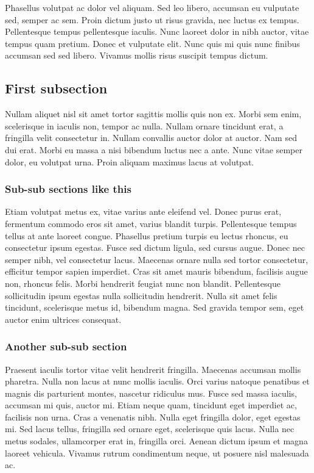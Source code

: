 \documentclass[12pt,letterpaper]{article}
\begin{document}
Phasellus volutpat ac dolor vel aliquam. Sed leo libero, accumsan eu vulputate sed, semper ac sem. Proin dictum justo ut risus gravida, nec luctus ex tempus. Pellentesque tempus pellentesque iaculis. Nunc laoreet dolor in nibh auctor, vitae tempus quam pretium. Donec et vulputate elit. Nunc quis mi quis nunc finibus accumsan sed sed libero. Vivamus mollis risus suscipit tempus dictum.

\subsection{First subsection}

Nullam aliquet nisl sit amet tortor sagittis mollis quis non ex. Morbi sem enim, scelerisque in iaculis non, tempor ac nulla. Nullam ornare tincidunt erat, a fringilla velit consectetur in. Nullam convallis auctor dolor at auctor. Nam sed dui erat. Morbi eu massa a nisi bibendum luctus nec a ante. Nunc vitae semper dolor, eu volutpat urna. Proin aliquam maximus lacus at volutpat.

\subsubsection{Sub-sub sections like this}

Etiam volutpat metus ex, vitae varius ante eleifend vel. Donec purus erat, fermentum commodo eros sit amet, varius blandit turpis. Pellentesque tempus tellus at ante laoreet congue. Phasellus pretium turpis eu lectus rhoncus, eu consectetur ipsum egestas. Fusce sed dictum ligula, sed cursus augue. Donec nec semper nibh, vel consectetur lacus. Maecenas ornare nulla sed tortor consectetur, efficitur tempor sapien imperdiet. Cras sit amet mauris bibendum, facilisis augue non, rhoncus felis. Morbi hendrerit feugiat nunc non blandit. Pellentesque sollicitudin ipsum egestas nulla sollicitudin hendrerit. Nulla sit amet felis tincidunt, scelerisque metus id, bibendum magna. Sed gravida tempor sem, eget auctor enim ultrices consequat.

\subsubsection{Another sub-sub section}

Praesent iaculis tortor vitae velit hendrerit fringilla. Maecenas accumsan mollis pharetra. Nulla non lacus at nunc mollis iaculis. Orci varius natoque penatibus et magnis dis parturient montes, nascetur ridiculus mus. Fusce sed massa iaculis, accumsan mi quis, auctor mi. Etiam neque quam, tincidunt eget imperdiet ac, facilisis non urna. Cras a venenatis nibh. Nulla eget fringilla dolor, eget egestas mi. Sed lacus tellus, fringilla sed ornare eget, scelerisque quis lacus. Nulla nec metus sodales, ullamcorper erat in, fringilla orci. Aenean dictum ipsum et magna laoreet vehicula. Vivamus rutrum condimentum neque, ut posuere nisl malesuada ac.
\end{document}
